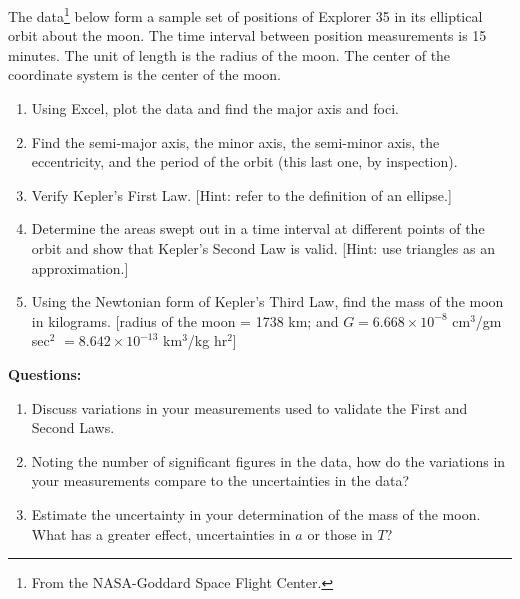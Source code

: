 \noindent The data\footnote{From the NASA-Goddard Space Flight Center.} below form a sample set of positions of Explorer 35 in its elliptical orbit about the moon. The time interval between position measurements is 15 minutes. The unit of length is the radius of the moon. The center of the coordinate system is the center of the moon. \\

\begin{enumerate}

\item Using Excel, plot the data and find the major axis and foci.

\item Find the semi-major axis, the minor axis, the semi-minor axis, the eccentricity, and the period of the orbit (this last one, by inspection).

\vskip35pt

\item Verify Kepler's First Law. [Hint: refer to the definition of an ellipse.]

\vskip35pt

\item Determine the areas swept out in a time interval at different points of the orbit and show that Kepler's Second Law is valid. [Hint: use triangles as an approximation.]

\vskip35pt

\item Using the Newtonian form of Kepler's Third Law, find the mass of the moon in kilograms. [radius of the moon = 1738 km; and $G = 6.668 \times 10^{-8}$ cm$^3$/gm sec$^2$ $= 8.642 \times 10^{-13}$ km$^3$/kg hr$^2$]

\end{enumerate}

\vfill \pagebreak 

\textbf{Questions:} 

\begin{enumerate}
\item Discuss variations in your measurements used to validate the First and Second
Laws.\vspace{30mm}

\item Noting the number of significant figures in the data, how do the variations
in your measurements compare to the uncertainties in the data?\vspace{30mm}

\item Estimate the uncertainty in your determination of the mass of the moon. What
has a greater effect, uncertainties in \( a \) or those in \( T \)?
\end{enumerate}
\vfill \pagebreak

